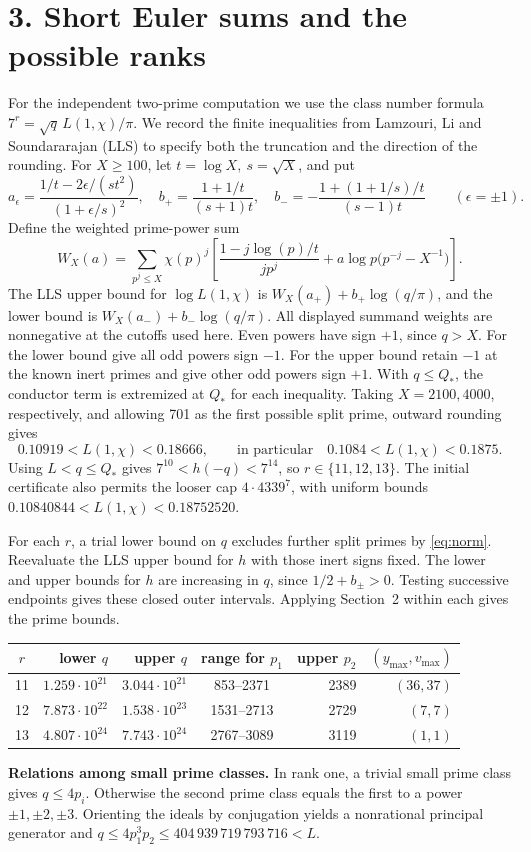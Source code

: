 \documentclass[11pt,letterpaper]{article}
\newcommand{\sect}[1]{\section*{#1}}
\begin{document}
\newpage
\sect{3. Short Euler sums and the possible ranks}
For the independent two-prime computation we use the class number formula
\(7^r=\sqrt q\,L(1,\chi)/\pi\). We record the finite inequalities from
Lamzouri, Li and Soundararajan (LLS) \cite[\S5]{LLS} to specify both the
truncation and the direction of the rounding. For \(X\ge100\), let
\(t=\log X,\ s=\sqrt X\), and put
\[
 a_\epsilon=\frac{1/t-2\epsilon/(st^2)}{(1+\epsilon/s)^2},\quad
 b_+=\frac{1+1/t}{(s+1)t},\quad
 b_-=-\frac{1+(1+1/s)/t}{(s-1)t}\qquad(\epsilon=\pm1).
\]
Define the weighted prime-power sum
\[
 W_X(a)=\sum_{p^j\le X}\chi(p)^j
 \left[\frac{1-j\log(p)/t}{j p^j}
       +a\log p\bigl(p^{-j}-X^{-1}\bigr)\right].
\]
The LLS upper bound for \(\log L(1,\chi)\) is
\(W_X(a_+)+b_+\log(q/\pi)\), and the lower bound is
\(W_X(a_-)+b_-\log(q/\pi)\). All displayed summand weights are
nonnegative at the cutoffs used here. Even powers have sign \(+1\), since
\(q>X\). For the lower bound give all odd powers sign \(-1\). For the upper
bound retain \(-1\) at the known inert primes and give other odd powers
sign \(+1\). With \(q\le Q_*\), the conductor term is extremized at \(Q_*\)
for each inequality. Taking \(X=2100,4000\), respectively, and allowing
701 as the first possible split prime, outward rounding gives
\[
 0.10919<L(1,\chi)<0.18666,\qquad
 \text{in particular}\quad 0.1084<L(1,\chi)<0.1875 .
\]
Using \(L<q\le Q_*\) gives \(7^{10}<h(-q)<7^{14}\), so \(r\in\{11,12,13\}\).
The initial certificate also permits the looser cap \(4\cdot4339^7\), with
uniform bounds \(0.10840844<L(1,\chi)<0.18752520\).

For each \(r\), a trial lower bound on \(q\) excludes further split primes
by \eqref{eq:norm}. Reevaluate the LLS upper bound for \(h\) with those
inert signs fixed. The lower and upper bounds for \(h\) are increasing in
\(q\), since \(1/2+b_\pm>0\). Testing successive endpoints gives these
closed outer intervals. Applying Section~2 within each gives the prime bounds.
\begin{center}
\begin{tabular}{@{}crrcrr@{}}
\toprule
\(r\)&lower \(q\)&upper \(q\)&range for \(p_1\)&upper \(p_2\)&\((y_{\max},v_{\max})\)\\
\midrule
11&\(1.259\cdot10^{21}\)&\(3.044\cdot10^{21}\)&853--2371&2389&\((36,37)\)\\
12&\(7.873\cdot10^{22}\)&\(1.538\cdot10^{23}\)&1531--2713&2729&\((7,7)\)\\
13&\(4.807\cdot10^{24}\)&\(7.743\cdot10^{24}\)&2767--3089&3119&\((1,1)\)\\
\bottomrule
\end{tabular}
\end{center}
\textbf{Relations among small prime classes.}
In rank one, a trivial small prime class gives \(q\le4p_i\). Otherwise
the second prime class equals the first to a power \(\pm1,\pm2,\pm3\).
Orienting the ideals by conjugation yields a nonrational principal
generator and \(q\le4p_1^3p_2\le404\,939\,719\,793\,716<L\).
\end{document}
